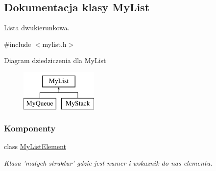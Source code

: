 \hypertarget{class_my_list}{\subsection{Dokumentacja klasy My\-List}
\label{class_my_list}
}


Lista dwukierunkowa.  




{\ttfamily \#include $<$mylist.\-h$>$}

Diagram dziedziczenia dla My\-List\begin{figure}[H]
\begin{center}
\leavevmode
\includegraphics[height=2.000000cm]{class_my_list}
\end{center}
\end{figure}
\subsubsection*{Komponenty}
\begin{DoxyCompactItemize}
\item 
class \hyperlink{class_my_list_1_1_my_list_element}{My\-List\-Element}
\begin{DoxyCompactList}\small\item\em Klasa 'malych struktur' gdzie jest numer i wskaznik do nas elementu. \end{DoxyCompactList}\end{DoxyCompactItemize}
